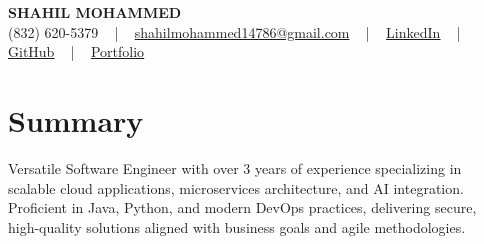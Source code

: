 \documentclass[letterpaper,10pt]{article}
\begin{document}
\begin{center}
    {\fontsize{14pt}{12pt}\selectfont \textbf{\MakeUppercase{Shahil Mohammed}}}\\ \vspace{2pt}
    \fontsize{10pt}{12pt}\selectfont (832) 620-5379 ~ | ~ \href{mailto:shahilmohammed14786@gmail.com}{shahilmohammed14786@gmail.com} ~ | ~  
    \href{https://www.linkedin.com/in/shahil-mohammed-9652931a1/}{\color{blue}\underline{LinkedIn}}  ~ | ~ 
    \href{https://github.com/freakbeast14}{\color{blue}\underline{GitHub}} ~ | ~ 
    \href{https://shahil-mohammed.netlify.app/}{\color{blue}\underline{Portfolio}}
    \vspace{-8pt}
\end{center}

\section{Summary}
\vspace{-2pt}\fontsize{8pt}{9pt}\selectfont
Versatile Software Engineer with over 3 years of experience specializing in scalable cloud applications, microservices architecture, and AI integration. Proficient in Java, Python, and modern DevOps practices, delivering secure, high-quality solutions aligned with business goals and agile methodologies.
 \vspace{-5pt}
 
\vspace{-2pt}
\end{document}
